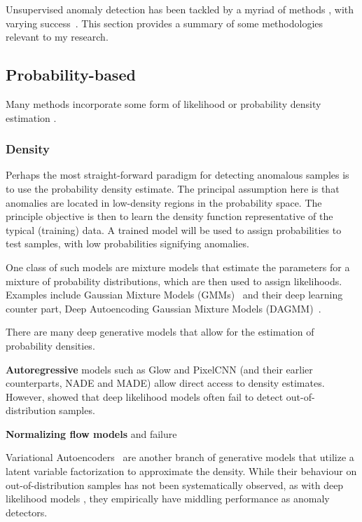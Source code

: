 Unsupervised anomaly detection has been tackled by a myriad of methods \cite{pang_deep_2021,ruff_unifying_2021}, with varying success~\cite{han2022adbench}. This section provides a summary of some methodologies relevant to my research.

\subsection{Probability-based}

Many methods incorporate some form of likelihood or probability density estimation . 

\subsubsection*{Density}
Perhaps the most straight-forward paradigm for detecting anomalous samples is to use the probability density estimate. The principal assumption here is that anomalies are located in low-density regions in the probability space. The principle objective is then to learn the density function representative of the typical (training) data. A trained model will be used to assign probabilities to test samples, with low probabilities signifying anomalies.


One class of such models are mixture models that estimate the parameters for a mixture of probability distributions, which are then used to assign likelihoods.
Examples include Gaussian Mixture Models (GMMs)~\cite{reynolds2009gaussian} and their deep learning counter part, Deep Autoencoding Gaussian Mixture Models (DAGMM)~\cite{zong2018deep}.

There are many deep generative models that allow for the estimation of probability densities. 

\textbf{Autoregressive} models such as Glow and PixelCNN (and their earlier counterparts, NADE and MADE) allow direct access to density estimates. However, \cite{nalisnick2018do} showed that deep likelihood models often fail to detect out-of-distribution samples.

\textbf{Normalizing flow models} and failure


Variational Autoencoders~\cite{kingma2013auto} are another branch of generative models that utilize a latent variable factorization to approximate the density. While their behaviour on out-of-distribution samples has not been systematically observed, as with deep likelihood models , they empirically have middling performance as anomaly detectors.


